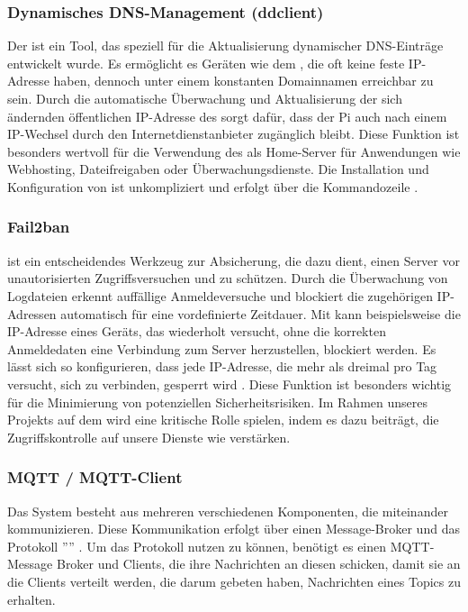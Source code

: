 \subsubsection{Dynamisches DNS-Management (ddclient)}
Der  ist ein Tool, das speziell für die Aktualisierung dynamischer DNS-Einträge entwickelt wurde. Es ermöglicht es Geräten wie dem , die oft keine feste IP-Adresse haben, dennoch unter einem konstanten Domainnamen erreichbar zu sein. Durch die automatische Überwachung und Aktualisierung der sich ändernden öffentlichen IP-Adresse des  sorgt  dafür, dass der Pi auch nach einem IP-Wechsel durch den Internetdienstanbieter zugänglich bleibt. Diese Funktion ist besonders wertvoll für die Verwendung des  als Home-Server für Anwendungen wie Webhosting, Dateifreigaben oder Überwachungsdienste. Die Installation und Konfiguration von  ist unkompliziert und erfolgt über die Kommandozeile \cite{ddclient}.

\subsubsection{Fail2ban}
 ist ein entscheidendes Werkzeug zur Absicherung, die dazu dient, einen Server vor unautorisierten Zugriffsversuchen und  zu schützen. Durch die Überwachung von Logdateien erkennt  auffällige Anmeldeversuche und blockiert die zugehörigen IP-Adressen automatisch für eine vordefinierte Zeitdauer. Mit  kann beispielsweise die IP-Adresse eines Geräts, das wiederholt versucht, ohne die korrekten Anmeldedaten eine Verbindung zum Server herzustellen, blockiert werden. Es lässt sich so konfigurieren, dass jede IP-Adresse, die mehr als dreimal pro Tag versucht, sich zu verbinden, gesperrt wird \cite{Fail2ban}. Diese Funktion ist besonders wichtig für die Minimierung von potenziellen Sicherheitsrisiken. Im Rahmen unseres Projekts auf dem  wird  eine kritische Rolle spielen, indem es dazu beiträgt, die Zugriffskontrolle auf unsere Dienste wie  verstärken.

\subsubsection{MQTT / MQTT-Client}
Das System besteht aus mehreren verschiedenen Komponenten, die miteinander kommunizieren. Diese Kommunikation erfolgt über einen Message-Broker und das Protokoll '''' \cite{MQTT}. Um das Protokoll nutzen zu können, benötigt es einen MQTT-Message Broker und Clients, die ihre Nachrichten an diesen schicken, damit sie an die Clients verteilt werden, die darum gebeten haben, Nachrichten eines Topics zu erhalten.

